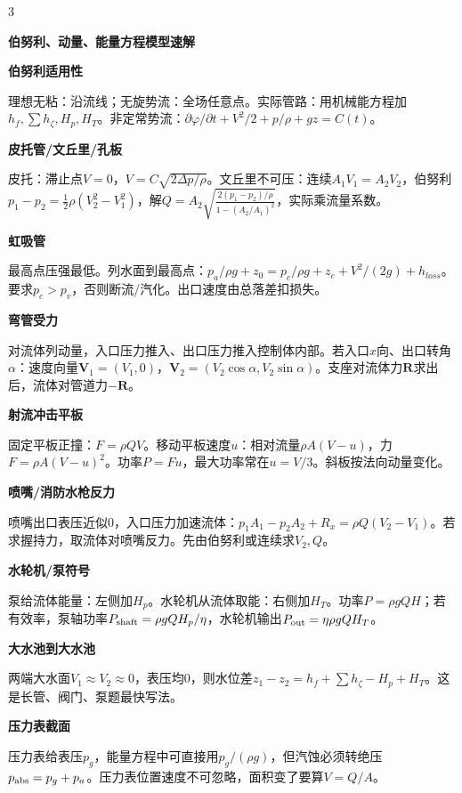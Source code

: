 \documentclass[a4paper]{article}
\newcommand{\qt}[1]{\vspace{0.25pt}\colorbox{Q}{\parbox{\dimexpr\linewidth-2\fboxsep}{\color{white}\bfseries #1}}\par}
\newcommand{\sect}[1]{\qt{#1}}
\begin{document}
\begin{multicols}{3}
{\sect{伯努利、动量、能量方程模型速解}
\sect{伯努利适用性}
理想无粘：沿流线；无旋势流：全场任意点。实际管路：用机械能方程加$h_f,\sum h_\zeta,H_p,H_T$。非定常势流：$\partial\varphi/\partial t+V^2/2+p/\rho+gz=C(t)$。
\sect{皮托管/文丘里/孔板}
皮托：滞止点$V=0$，$V=C\sqrt{2\Delta p/\rho}$。文丘里不可压：连续$A_1V_1=A_2V_2$，伯努利$p_1-p_2=\frac12\rho(V_2^2-V_1^2)$，解$Q=A_2\sqrt{\frac{2(p_1-p_2)/\rho}{1-(A_2/A_1)^2}}$，实际乘流量系数。
\sect{虹吸管}
最高点压强最低。列水面到最高点：$p_a/\rho g+z_0=p_c/\rho g+z_c+V^2/(2g)+h_{loss}$。要求$p_c>p_v$，否则断流/汽化。出口速度由总落差扣损失。
\sect{弯管受力}
对流体列动量，入口压力推入、出口压力推入控制体内部。若入口$x$向、出口转角$\alpha$：速度向量$\bm V_1=(V_1,0)$，$\bm V_2=(V_2\cos\alpha,V_2\sin\alpha)$。支座对流体力$\bm R$求出后，流体对管道力$-\bm R$。
\sect{射流冲击平板}
固定平板正撞：$F=\rho QV$。移动平板速度$u$：相对流量$\rho A(V-u)$，力$F=\rho A(V-u)^2$。功率$P=Fu$，最大功率常在$u=V/3$。斜板按法向动量变化。
\sect{喷嘴/消防水枪反力}
喷嘴出口表压近似0，入口压力加速流体：$p_1A_1-p_2A_2+R_x=\rho Q(V_2-V_1)$。若求握持力，取流体对喷嘴反力。先由伯努利或连续求$V_2,Q$。
\sect{水轮机/泵符号}
泵给流体能量：左侧加$H_p$。水轮机从流体取能：右侧加$H_T$。功率$P=\rho gQH$；若有效率，泵轴功率$P_{\rm shaft}=\rho gQH_p/\eta$，水轮机输出$P_{\rm out}=\eta\rho gQH_T$。
\sect{大水池到大水池}
两端大水面$V_1\approx V_2\approx0$，表压均0，则水位差$z_1-z_2=h_f+\sum h_\zeta-H_p+H_T$。这是长管、阀门、泵题最快写法。
\sect{压力表截面}
压力表给表压$p_g$，能量方程中可直接用$p_g/(\rho g)$，但汽蚀必须转绝压$p_{\rm abs}=p_g+p_a$。压力表位置速度不可忽略，面积变了要算$V=Q/A$。

}
\end{multicols}
\end{document}
